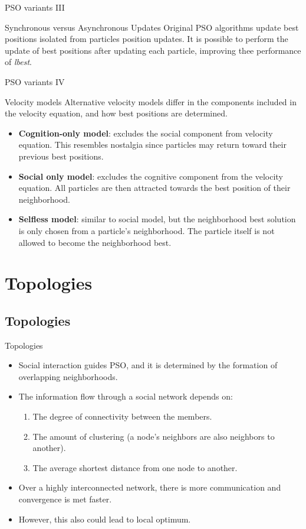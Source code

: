 \documentclass[aspectratio=169,compress,10pt]{beamer}
\begin{document}
\begin{frame}{PSO variants III}
\begin{block}{Synchronous versus Asynchronous Updates}
Original PSO algorithms update best positions isolated from particles position updates.
It is possible to perform the update of best positions after updating each particle, improving thee performance of \emph{lbest}.
\end{block}
\end{frame}

\begin{frame}{PSO variants IV}
\begin{block}{Velocity models}
Alternative velocity models differ in the components included in the velocity equation, and how best positions are determined.
\begin{itemize}
	\item \textbf{Cognition-only model}: excludes the social component from velocity equation.
	This resembles nostalgia since particles may return toward their previous best positions.
	\item \textbf{Social only model}: excludes the cognitive component from the velocity equation.
	All particles are then attracted towards the best position of their neighborhood.
	\item \textbf{Selfless model}: similar to social model, but the neighborhood best solution is only chosen from a particle's neighborhood.
	The particle itself is not allowed to become the neighborhood best.
\end{itemize}
\end{block}
\end{frame}

\section{Topologies} 
\subsection{Topologies}
\begin{frame}{Topologies}
\begin{itemize}
	\item Social interaction guides PSO, and it is determined by the formation of overlapping neighborhoods.
	\item The information flow through a social network depends on:
	\begin{enumerate}
		\item The degree of connectivity between the members.
		\item The amount of clustering (a node's neighbors are also neighbors to another).
		\item The average shortest distance from one node to another.
	\end{enumerate}
	\item Over a highly interconnected network, there is more communication and convergence is met faster.
	\item However, this also could lead to local optimum.
\end{itemize}
\end{frame}
\end{document}
